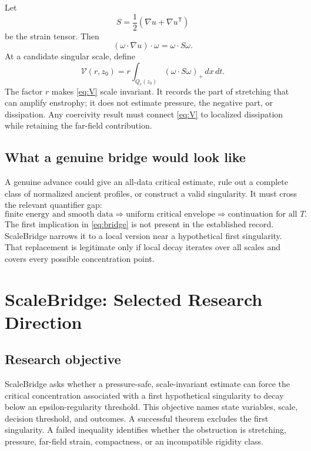 \documentclass[conference]{../../../../Conference-LaTeX-template_10-17-19/IEEEtran}
\begin{document}
Let
\begin{equation}
S=\frac{1}{2}(\nabla u+\nabla u^\mathsf{T})
\end{equation}
be the strain tensor. Then
\begin{equation}
(\omega\cdot\nabla u)\cdot\omega=\omega\cdot S\omega.
\label{eq:stretch}
\end{equation}
At a candidate singular scale, define
\begin{equation}
\mathcal V(r,z_0)=r\int_{Q_r(z_0)}
(\omega\cdot S\omega)_+\,dx\,dt.
\label{eq:V}
\end{equation}
The factor $r$ makes \eqref{eq:V} scale invariant. It records the part of stretching that can amplify enstrophy; it does not estimate pressure, the negative part, or dissipation. Any coercivity result must connect \eqref{eq:V} to localized dissipation while retaining the far-field contribution.

\subsection{What a genuine bridge would look like}
A genuine advance could give an all-data critical estimate, rule out a complete class of normalized ancient profiles, or construct a valid singularity. It must cross the relevant quantifier gap:
\begin{equation}
\text{finite energy and smooth data}
\Longrightarrow
\text{uniform critical envelope}
\Longrightarrow
\text{continuation for all }T.
\label{eq:bridge}
\end{equation}
The first implication in \eqref{eq:bridge} is not present in the established record. ScaleBridge narrows it to a local version near a hypothetical first singularity. That replacement is legitimate only if local decay iterates over all scales and covers every possible concentration point.

\section{ScaleBridge: Selected Research Direction}
\subsection{Research objective}
ScaleBridge asks whether a pressure-safe, scale-invariant estimate can force the critical concentration associated with a first hypothetical singularity to decay below an epsilon-regularity threshold. This objective names state variables, scale, decision threshold, and outcomes. A successful theorem excludes the first singularity. A failed inequality identifies whether the obstruction is stretching, pressure, far-field strain, compactness, or an incompatible rigidity class.
\end{document}

